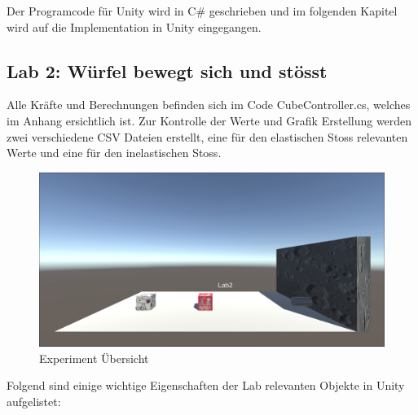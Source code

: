 \documentclass[../main.tex]{subfiles}
\begin{document}
    Der Programcode für Unity wird in C\# geschrieben und im folgenden Kapitel wird auf die Implementation in Unity eingegangen.

    \subsection{Lab 2: Würfel bewegt sich und stösst}
    Alle Kräfte und Berechnungen befinden sich im Code CubeController.cs, welches im Anhang ersichtlich ist.
    Zur Kontrolle der Werte und Grafik Erstellung werden zwei verschiedene CSV Dateien erstellt,
    eine für den elastischen Stoss relevanten Werte und eine für den inelastischen Stoss.

    \begin{figure}[H]
        \begin{center}
            \centerline{\includegraphics[width=155mm]{./images/2Lab_ExperimentOverview}}
            \caption{Experiment Übersicht}
            \label{fig:2Lab_ExperimentOverview}
        \end{center}
    \end{figure}

    Folgend sind einige wichtige Eigenschaften der Lab relevanten Objekte in Unity aufgelistet:
\end{document}
